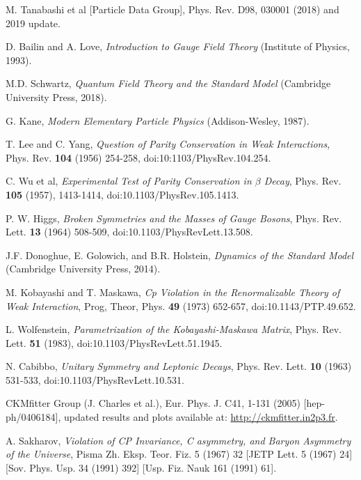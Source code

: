 \documentclass[a4paper,12pt]{article}
\begin{document}
\begin{thebibliography}{99}

M. Tanabashi et al [Particle Data Group], Phys. Rev. D98, 030001 (2018) and 2019 update.

D. Bailin and A. Love, \emph{Introduction to Gauge Field Theory} (Institute of Physics, 1993).

M.D. Schwartz, \emph{Quantum Field Theory and the Standard Model} (Cambridge University Press, 2018).

G. Kane, \emph{Modern Elementary Particle Physics} (Addison-Wesley, 1987).

T. Lee and C. Yang, \emph{Question of Parity Conservation in Weak Interactions}, Phys. Rev. \textbf{104} (1956) 254-258, doi:10:1103/PhysRev.104.254.

C. Wu et al, \emph{Experimental Test of Parity Conservation in $\beta$ Decay}, Phys. Rev. \textbf{105} (1957), 1413-1414, doi:10.1103/PhysRev.105.1413.

P. W. Higgs, \emph{Broken Symmetries and the Masses of Gauge Bosons}, Phys. Rev. Lett. \textbf{13} (1964) 508-509, doi:10.1103/PhysRevLett.13.508.

J.F. Donoghue, E. Golowich, and B.R. Holstein, \emph{Dynamics of the Standard Model} (Cambridge University Press, 2014).

M. Kobayashi and T. Maskawa, \emph{Cp Violation in the Renormalizable Theory of Weak Interaction}, Prog, Theor, Phys. \textbf{49} (1973) 652-657, doi:10.1143/PTP.49.652.

L. Wolfenstein, \emph{Parametrization of the Kobayashi-Maskawa Matrix}, Phys. Rev. Lett. \textbf{51} (1983), doi:10.1103/PhysRevLett.51.1945.

N. Cabibbo, \emph{Unitary Symmetry and Leptonic Decays}, Phys. Rev. Lett. \textbf{10} (1963) 531-533, doi:10.1103/PhysRevLett.10.531.

CKMfitter Group (J. Charles et al.), Eur. Phys. J. C41, 1-131 (2005) [hep-ph/0406184], updated results and plots available at: \href{http://ckmfitter.in2p3.fr}{http://ckmfitter.in2p3.fr}.

A. Sakharov, \emph{Violation of CP Invariance, C asymmetry, and Baryon Asymmetry of the Universe}, Pisma Zh. Eksp. Teor. Fiz. 5 (1967) 32 [JETP Lett. 5 (1967) 24] [Sov. Phys. Usp. 34 (1991) 392] [Usp. Fiz. Nauk 161 (1991) 61].


\end{thebibliography}
\end{document}
